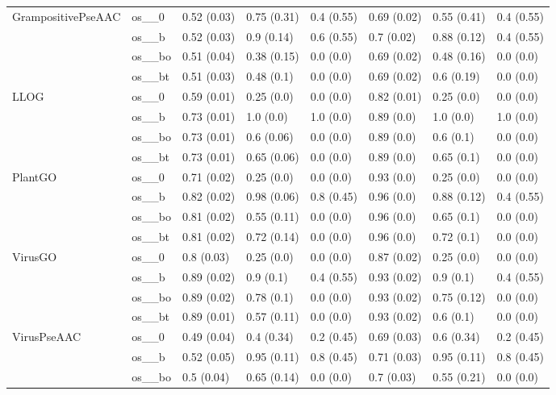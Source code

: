 \begin{tabular}{llllllll}
\cline{1-8}
\multirow[t]{4}{*}{GrampositivePseAAC} & os__0 & 0.52 (0.03) & 0.75 (0.31) & 0.4 (0.55) & 0.69 (0.02) & 0.55 (0.41) & 0.4 (0.55) \\
 & os__b & 0.52 (0.03) & 0.9 (0.14) & 0.6 (0.55) & 0.7 (0.02) & 0.88 (0.12) & 0.4 (0.55) \\
 & os__bo & 0.51 (0.04) & 0.38 (0.15) & 0.0 (0.0) & 0.69 (0.02) & 0.48 (0.16) & 0.0 (0.0) \\
 & os__bt & 0.51 (0.03) & 0.48 (0.1) & 0.0 (0.0) & 0.69 (0.02) & 0.6 (0.19) & 0.0 (0.0) \\
\cline{1-8}
\multirow[t]{4}{*}{LLOG} & os__0 & 0.59 (0.01) & 0.25 (0.0) & 0.0 (0.0) & 0.82 (0.01) & 0.25 (0.0) & 0.0 (0.0) \\
 & os__b & 0.73 (0.01) & 1.0 (0.0) & 1.0 (0.0) & 0.89 (0.0) & 1.0 (0.0) & 1.0 (0.0) \\
 & os__bo & 0.73 (0.01) & 0.6 (0.06) & 0.0 (0.0) & 0.89 (0.0) & 0.6 (0.1) & 0.0 (0.0) \\
 & os__bt & 0.73 (0.01) & 0.65 (0.06) & 0.0 (0.0) & 0.89 (0.0) & 0.65 (0.1) & 0.0 (0.0) \\
\cline{1-8}
\multirow[t]{4}{*}{PlantGO} & os__0 & 0.71 (0.02) & 0.25 (0.0) & 0.0 (0.0) & 0.93 (0.0) & 0.25 (0.0) & 0.0 (0.0) \\
 & os__b & 0.82 (0.02) & 0.98 (0.06) & 0.8 (0.45) & 0.96 (0.0) & 0.88 (0.12) & 0.4 (0.55) \\
 & os__bo & 0.81 (0.02) & 0.55 (0.11) & 0.0 (0.0) & 0.96 (0.0) & 0.65 (0.1) & 0.0 (0.0) \\
 & os__bt & 0.81 (0.02) & 0.72 (0.14) & 0.0 (0.0) & 0.96 (0.0) & 0.72 (0.1) & 0.0 (0.0) \\
\cline{1-8}
\multirow[t]{4}{*}{VirusGO} & os__0 & 0.8 (0.03) & 0.25 (0.0) & 0.0 (0.0) & 0.87 (0.02) & 0.25 (0.0) & 0.0 (0.0) \\
 & os__b & 0.89 (0.02) & 0.9 (0.1) & 0.4 (0.55) & 0.93 (0.02) & 0.9 (0.1) & 0.4 (0.55) \\
 & os__bo & 0.89 (0.02) & 0.78 (0.1) & 0.0 (0.0) & 0.93 (0.02) & 0.75 (0.12) & 0.0 (0.0) \\
 & os__bt & 0.89 (0.01) & 0.57 (0.11) & 0.0 (0.0) & 0.93 (0.02) & 0.6 (0.1) & 0.0 (0.0) \\
\cline{1-8}
\multirow[t]{4}{*}{VirusPseAAC} & os__0 & 0.49 (0.04) & 0.4 (0.34) & 0.2 (0.45) & 0.69 (0.03) & 0.6 (0.34) & 0.2 (0.45) \\
 & os__b & 0.52 (0.05) & 0.95 (0.11) & 0.8 (0.45) & 0.71 (0.03) & 0.95 (0.11) & 0.8 (0.45) \\
 & os__bo & 0.5 (0.04) & 0.65 (0.14) & 0.0 (0.0) & 0.7 (0.03) & 0.55 (0.21) & 0.0 (0.0) \\

\end{tabular}
